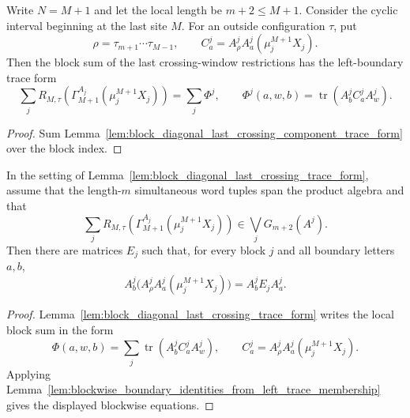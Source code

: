 \begin{lemma}
    \label{lem:block_diagonal_last_crossing_trace_form}
    \leanok
    Write \(N=M+1\) and let the local length be \(m+2\le M+1\). Consider the
    cyclic interval beginning at the last site \(M\). For an outside
    configuration \(\tau\), put
    \[
        \rho=\tau_{m+1}\cdots\tau_{M-1},
        \qquad
        C^j_a=A^j_\rho A^j_a(\mu_j^{M+1}X_j).
    \]
    Then the block sum of the last crossing-window restrictions has the
    left-boundary trace form
    \[
        \sum_j
        R_{M,\tau}\!\left(\Gamma_{M+1}^{A_j}(\mu_j^{M+1}X_j)\right)
        =
        \sum_j \Phi^j,
        \qquad
        \Phi^j(a,w,b)=\operatorname{tr}\!\left(A^j_b C^j_a A^j_w\right).
    \]
\end{lemma}

\begin{proof}
    \leanok
    Sum Lemma~\ref{lem:block_diagonal_last_crossing_component_trace_form} over
    the block index.
\end{proof}

\begin{lemma}
    \label{lem:block_diagonal_last_crossing_coefficients_from_sum_membership}
    \leanok
    In the setting of Lemma~\ref{lem:block_diagonal_last_crossing_trace_form},
    assume that the length-\(m\) simultaneous word tuples span the product
    algebra and that
    \[
        \sum_j
        R_{M,\tau}\!\left(\Gamma_{M+1}^{A_j}(\mu_j^{M+1}X_j)\right)
        \in \bigvee_j G_{m+2}(A^j).
    \]
    Then there are matrices \(E_j\) such that, for every block \(j\) and all
    boundary letters \(a,b\),
    \[
        A^j_b\bigl(A^j_\rho A^j_a(\mu_j^{M+1}X_j)\bigr)
        =
        A^j_bE_jA^j_a .
    \]
\end{lemma}

\begin{proof}
    \leanok
    Lemma~\ref{lem:block_diagonal_last_crossing_trace_form} writes the local
    block sum in the form
    \[
        \Phi(a,w,b)=
        \sum_j\operatorname{tr}\!\left(A^j_bC^j_aA^j_w\right),
        \qquad
        C^j_a=A^j_\rho A^j_a(\mu_j^{M+1}X_j).
    \]
    Applying
    Lemma~\ref{lem:blockwise_boundary_identities_from_left_trace_membership}
    gives the displayed blockwise equations.
\end{proof}

